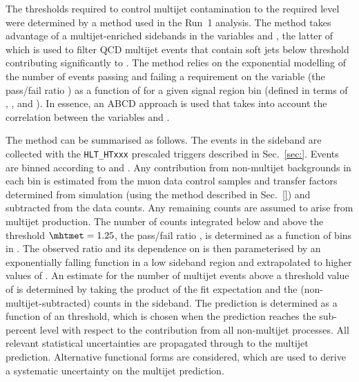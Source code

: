 The \alphat thresholds required to control multijet contamination to
the required level were determined by a method used in the Run~1
analysis. The method takes advantage of a multijet-enriched sidebands
in the variables \alphat and \mhtmet, the latter of which is used to
filter QCD multijet events that contain soft jets below threshold
contributing significantly to \mht. The method relies on the
exponential modelling of the number of events passing and failing a
requirement on the variable \mhtmet (\ie the pass/fail ratio \rmhtmet)
as a function of \alphat for a given signal region bin (defined in
terms of \njet, \nb, and \scalht). In essence, an ABCD approach is
used that takes into account the correlation between the variables
\rmhtmet and \alphat.

The method can be summarised as follows. The events in the sideband
are collected with the \texttt{HLT\_HTxxx} prescaled triggers
described in Sec.~\ref{sec:}. Events are binned according to \alphat
and \mhtmet. Any contribution from non-multijet backgrounds in each
bin is estimated from the muon data control samples and transfer
factors determined from simulation (using the method described in
Sec.~\ref{}) and subtracted from the data counts. Any remaining counts
are assumed to arise from multijet production. The number of counts
integrated below and above the threshold $\mhtmet = 1.25$, \ie the
pass/fail ratio \rmhtmet, is determined as a function of bins in
\alphat. The observed ratio and its dependence on \alphat is then
parameterised by an exponentially falling function in a low \alphat
sideband region and extrapolated to higher values of \alphat. An
estimate for the number of multijet events above a threshold value of
\alphat is determined by taking the product of the fit expectation and
the (non-multijet-subtracted) counts in the \mhtmet sideband. The
prediction is determined as a function of an \alphat threshold, which
is chosen when the prediction reaches the sub-percent level with
respect to the contribution from all non-multijet processes. All
relevant statistical uncertainties are propagated through to the
multijet prediction. Alternative functional forms are considered,
which are used to derive a systematic uncertainty on the multijet
prediction. 

